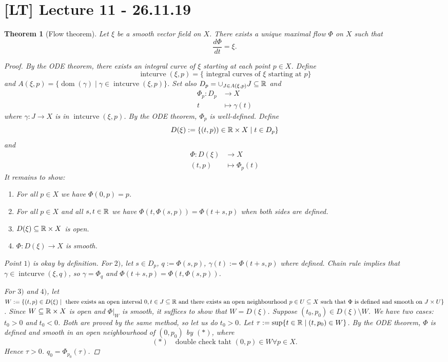 \documentclass[A4paper, british, reqno]{amsart}
\theoremstyle{darkgreentheorem}
\newtheorem{thm}{Theorem}[section]
\theoremstyle{darkbluedefinition}
\theoremstyle{darkredexample}
\theoremstyle{remark}
\newcommand{\1}{\mathbbm{1}}
\newcommand{\tms}{\times}
\newcommand{\sub}{\subseteq}
\begin{document}
\section{[LT] Lecture 11 - 26.11.19}

\begin{thm}[Flow theorem]
    Let $\xi$ be a smooth vector field on $X$.
    There exists a unique maximal flow $\Phi$ on $X$ such that
    \[ \frac{d\Phi}{dt}=\xi .\]
    \begin{proof}
	By the ODE theorem, there exists an integral curve of $\xi$ starting at each point $p\in X$.
	Define
	\[ \operatorname{intcurve}(\xi,p)=\{ \text{ integral curves of }\xi\text{ starting at }p\} \]
	and $A(\xi,p)=\{\operatorname{dom}(\gamma)\mid \gamma\in \operatorname{intcurve}(\xi,p)\}$.
	Set also $D_{p}=\cup_{J\in A(\xi,p)}J \sub \R$ and
	\begin{align*}
	    \Phi_{p} \colon D_{p} & \to X \\
	    t & \mapsto \gamma(t) 
	\end{align*}
	where $\gamma\colon J\to X$ is in $\operatorname{intcurve}(\xi,p)$.
	By the ODE theorem, $\Phi_{p}$ is well-defined.
	Define
	\[ D(\xi):=\{ (t,p))\in \R\tms X\mid t\in D_{p} \}\]
	and
	\begin{align*}
	    \Phi\colon D(\xi) & \to X \\
	    (t,p) & \mapsto \Phi_{p}(t)
	\end{align*}
	It remains to show:
	\begin{enumerate}
	    \item For all $p\in X$ we have $\Phi(0,p)=p$.
	    \item For all $p\in X$ and all $s,t\in \mathbb{R}$ we have $\Phi(t,\Phi(s,p))=\Phi(t+s,p)$ when both sides are defined.
	    \item $D(\xi)\sub \R\tms X$ is open.
	    \item $\Phi\colon D(\xi)\to X$ is smooth.
	\end{enumerate}
	Point $1)$ is okay by definition.
	For $2)$, let $s\in D_{p}$, $q:=\Phi(s,p)$, $\gamma(t):=\Phi(t+s,p)$ where defined.
	Chain rule implies that $\gamma\in \operatorname{intcurve}(\xi,q)$, so $\gamma=\Phi_{q}$ and $\Phi(t+s,p)=\Phi(t,\Phi(s,p))$.

	For $3)$ and $4)$, let $W:=\{ (t,p)\in D(\xi)\mid \text{ there exists an open interval }0,t\in J\sub \R\text{ and there exists an open neighbourhood }p\in U\sub X \text{ such that } \Phi \text{ is defined and smooth on }J\tms U \}$.
	Since $W\sub \R\tms X$ is open and $\Phi|_{W}$ is smooth, it suffices to show that $W=D(\xi)$.
	Suppose $(t_{0},p_{0})\in D(\xi)\setminus W$.
	We have two cases: $t_{0}>0$ and $t_{0}<0$.
	Both are proved by the same method, so let us do $t_{0}>0$.
	Let $\tau:=\sup\{t\in \mathbb{R}\mid (t,p_{0})\in W \}$.
	By the ODE theorem, $\Phi$ is defined and smooth in an open neighbourhood of $(0,p_{0})$ by $(*)$, where
	\[ (*)\quad \text{double check taht }(0,p)\in W \forall p\in X.\]
	Hence $\tau>0$.
	$q_{0}=\Phi_{p_{0}}(\tau)$.


\end{proof}
\end{thm}
\end{document}
